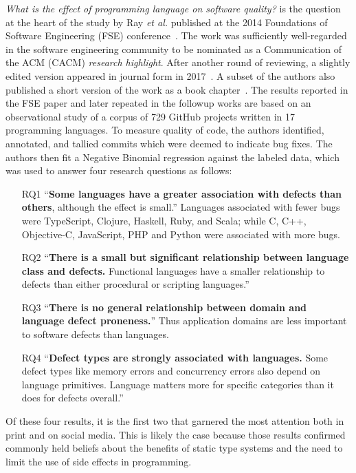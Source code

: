 \documentclass[acmsmall]{acmart}
\renewcommand{\c}{{\sf  C}\xspace}
\newcommand{\objc}{{\sf  Objective-C}\xspace}
\newcommand{\cpp}{{\sf  C++}\xspace}
\newcommand{\python}{{\sf  Python}\xspace}
\newcommand{\ruby}{{\sf  Ruby}\xspace}
\newcommand{\scala}{{\sf  Scala}\xspace}
\newcommand{\ts}{{\sf  TypeScript}\xspace}
\newcommand{\js}{{\sf  JavaScript}\xspace}
\newcommand{\haskell}{{\sf  Haskell}\xspace}
\newcommand{\php}{{\sf  PHP}\xspace}
\newcommand{\clojure}{{\sf  Clojure}\xspace}
\newcommand{\gh}{{GitHub}\xspace}
\newcommand{\ea}{\emph{et al.}\xspace}
\begin{document}
\emph{What is the effect of programming language on software quality?} is
the question at the heart of the study by Ray \ea published at the 2014
Foundations of Software Engineering (FSE) conference~\cite{ray14}. The work
was sufficiently well-regarded in the software engineering community to be
nominated as a Communication of the ACM (CACM) \emph{research highlight}.
After another round of reviewing, a slightly edited version appeared
in journal form in 2017~\cite{ray17}. A subset of the authors also published
a short version of the work as a book chapter~\cite{book}.  The results
reported in the FSE paper and later repeated in the followup works are based
on an observational study of a corpus of 729 \gh projects written in 17
programming languages. To measure quality of code, the authors identified,
annotated, and tallied commits which were deemed to indicate bug fixes. The
authors then fit a Negative Binomial regression against the labeled data,
which was used to answer four research questions as follows:
\begin{enumerate}
\item[RQ1] ``{\bf Some languages have a greater association with defects
  than others}, although the effect is small.'' Languages associated with
  fewer bugs were \ts, \clojure, \haskell, \ruby, and \scala; while \c,
  \cpp, \objc, \js, \php and \python were associated with more bugs.
\item[RQ2] ``{\bf There is a small but significant relationship between
  language class and defects.} Functional languages have a smaller
  relationship to defects than either procedural or scripting languages.''
\item[RQ3] ``{\bf There is no general relationship between domain and
  language defect proneness.}'' Thus application domains are less important
  to software defects than languages.
\item[RQ4] ``{\bf Defect types are strongly associated with languages.} Some
  defect types like memory errors and concurrency errors also depend on language
  primitives. Language matters more for specific categories than it does for
  defects overall.''
\end{enumerate}
Of these four results, it is the first two that garnered the most attention
both in print and on social media. This is likely the case because those
results confirmed commonly held beliefs about the benefits of static type
systems and the need to limit the use of side effects in programming.
\end{document}
